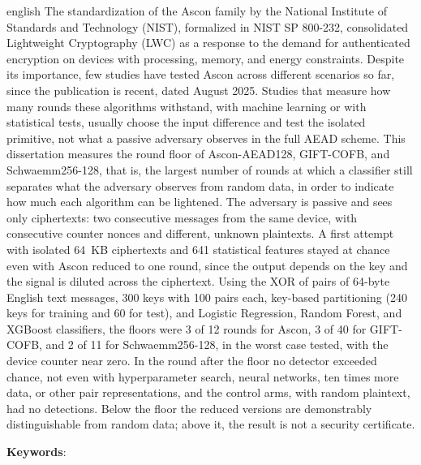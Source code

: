 \begin{resumo}[Abstract]
 \begin{otherlanguage*}{english}
\SingleSpacing
The standardization of the Ascon family by the National Institute of Standards and Technology (NIST), formalized in NIST SP 800-232, consolidated Lightweight Cryptography (LWC) as a response to the demand for authenticated encryption on devices with processing, memory, and energy constraints. Despite its importance, few studies have tested Ascon across different scenarios so far, since the publication is recent, dated August 2025.
Studies that measure how many rounds these algorithms withstand, with machine learning or with statistical tests, usually choose the input difference and test the isolated primitive, not what a passive adversary observes in the full AEAD scheme. This dissertation measures the round floor of Ascon-AEAD128, GIFT-COFB, and Schwaemm256-128, that is, the largest number of rounds at which a classifier still separates what the adversary observes from random data, in order to indicate how much each algorithm can be lightened. The adversary is passive and sees only ciphertexts: two consecutive messages from the same device, with consecutive counter nonces and different, unknown plaintexts. A first attempt with isolated 64~KB ciphertexts and 641 statistical features stayed at chance even with Ascon reduced to one round, since the output depends on the key and the signal is diluted across the ciphertext. Using the XOR of pairs of 64-byte English text messages, 300 keys with 100 pairs each, key-based partitioning (240 keys for training and 60 for test), and Logistic Regression, Random Forest, and XGBoost classifiers, the floors were 3 of 12 rounds for Ascon, 3 of 40 for GIFT-COFB, and 2 of 11 for Schwaemm256-128, in the worst case tested, with the device counter near zero. In the round after the floor no detector exceeded chance, not even with hyperparameter search, neural networks, ten times more data, or other pair representations, and the control arms, with random plaintext, had no detections. Below the floor the reduced versions are demonstrably distinguishable from random data; above it, the result is not a security certificate.
   \vspace{\onelineskip}

   \noindent
   \textbf{Keywords}: \imprimirkeywords
 \end{otherlanguage*}
\end{resumo}